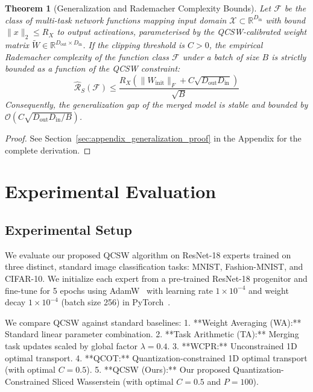\documentclass{article}
\theoremstyle{plain}
\newtheorem{theorem}{Theorem}[section]
\theoremstyle{definition}
\theoremstyle{remark}
\begin{document}
\begin{theorem}[Generalization and Rademacher Complexity Bounds]
\label{thm:generalization_bound}
Let $\mathcal{F}$ be the class of multi-task network functions mapping input domain $\mathcal{X} \subset \mathbb{R}^{D_{\text{in}}}$ with bound $\|x\|_2 \le R_X$ to output activations, parameterised by the QCSW-calibrated weight matrix $\tilde{W} \in \mathbb{R}^{D_{\text{out}} \times D_{\text{in}}}$. If the clipping threshold is $C > 0$, the empirical Rademacher complexity of the function class $\mathcal{F}$ under a batch of size $B$ is strictly bounded as a function of the QCSW constraint:
\begin{equation}
\widehat{\mathcal{R}}_S(\mathcal{F}) \le \frac{R_X \left( \|W_{\text{init}}\|_F + C \sqrt{D_{\text{out}} D_{\text{in}}} \right)}{\sqrt{B}}
\end{equation}
Consequently, the generalization gap of the merged model is stable and bounded by $\mathcal{O}(C \sqrt{D_{\text{out}} D_{\text{in}} / B})$.
\end{theorem}

\begin{proof}
See Section~\ref{sec:appendix_generalization_proof} in the Appendix for the complete derivation.
\end{proof}

\section{Experimental Evaluation}
\label{sec:experiments}

\subsection{Experimental Setup}
We evaluate our proposed QCSW algorithm on ResNet-18 experts trained on three distinct, standard image classification tasks: MNIST, Fashion-MNIST, and CIFAR-10. We initialize each expert from a pre-trained ResNet-18 progenitor and fine-tune for 5 epochs using AdamW~\cite{loshchilov2017decoupled} with learning rate $1 \times 10^{-4}$ and weight decay $1 \times 10^{-4}$ (batch size 256) in PyTorch~\cite{paszke2019pytorch}.

We compare QCSW against standard baselines:
1. **Weight Averaging (WA):** Standard linear parameter combination.
2. **Task Arithmetic (TA):** Merging task updates scaled by global factor $\lambda = 0.4$.
3. **WCPR:** Unconstrained 1D optimal transport.
4. **QCOT:** Quantization-constrained 1D optimal transport (with optimal $C=0.5$).
5. **QCSW (Ours):** Our proposed Quantization-Constrained Sliced Wasserstein (with optimal $C=0.5$ and $P=100$).
\end{document}
